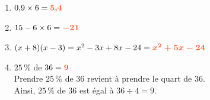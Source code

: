 \documentclass[a4paper,11pt]{article}
\begin{document}
\newpage \begin{seance}{} %

\begin{enumerate}
	\item $0{,}9 \times 6={\color[HTML]{f15929}\boldsymbol{5{,}4}}$
	\item $15-6\times6={\color[HTML]{f15929}\boldsymbol{-21}}$
	\item $(x+8)(x-3)=x^2-3x+8x-24={\color[HTML]{f15929}\boldsymbol{x^2+5x-24}}$
	\item $25\,\%$ de $36 = {\color[HTML]{f15929}\boldsymbol{9}}$\\ Prendre $25\,\%$  de $36$ revient à prendre le quart de $36$.\\
      Ainsi, $25\,\%$ de $36$ est égal à $36\div 4 =9$.
     

\end{enumerate}
\end{seance}
\end{document}
